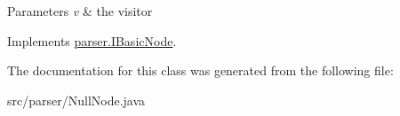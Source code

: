\begin{DoxyParams}{Parameters}
{\em v} & the visitor \\
\hline
\end{DoxyParams}


Implements \hyperlink{interfaceparser_1_1_i_basic_node_af8790b7076c59e00781ba3d4118757cd}{parser.\+I\+Basic\+Node}.



The documentation for this class was generated from the following file\+:\begin{DoxyCompactItemize}
\item 
src/parser/Null\+Node.\+java\end{DoxyCompactItemize}
